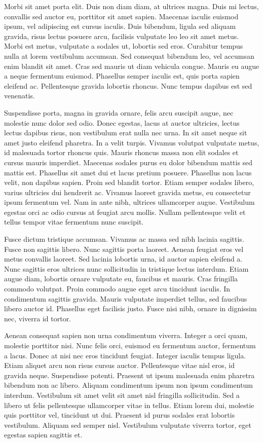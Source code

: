 Morbi sit amet porta elit. Duis non diam diam, at ultrices magna. Duis mi lectus, convallis sed auctor eu, porttitor sit amet sapien. Maecenas iaculis euismod ipsum, vel adipiscing est cursus iaculis. Duis bibendum, ligula sed aliquam gravida, risus lectus posuere arcu, facilisis vulputate leo leo sit amet metus. Morbi est metus, vulputate a sodales ut, lobortis sed eros. Curabitur tempus nulla at lorem vestibulum accumsan. Sed consequat bibendum leo, vel accumsan enim blandit sit amet. Cras sed mauris ut diam vehicula congue. Mauris eu augue a neque fermentum euismod. Phasellus semper iaculis est, quis porta sapien eleifend ac. Pellentesque gravida lobortis rhoncus. Nunc tempus dapibus est sed venenatis.

Suspendisse porta, magna in gravida ornare, felis arcu suscipit augue, nec molestie nunc dolor sed odio. Donec egestas, lacus at auctor ultricies, lectus lectus dapibus risus, non vestibulum erat nulla nec urna. In sit amet neque sit amet justo eleifend pharetra. In a velit turpis. Vivamus volutpat vulputate metus, id malesuada tortor rhoncus quis. Mauris rhoncus massa non elit sodales et cursus mauris imperdiet. Maecenas sodales purus eu dolor bibendum mattis sed mattis est. Phasellus sit amet dui et lacus pretium posuere. Phasellus non lacus velit, non dapibus sapien. Proin sed blandit tortor. Etiam semper sodales libero, varius ultricies dui hendrerit ac. Vivamus laoreet gravida metus, eu consectetur ipsum fermentum vel. Nam in ante nibh, ultrices ullamcorper augue. Vestibulum egestas orci ac odio cursus at feugiat arcu mollis. Nullam pellentesque velit et tellus tempor vitae fermentum nunc suscipit.

Fusce dictum tristique accumsan. Vivamus ac massa sed nibh lacinia sagittis. Fusce non sagittis libero. Nunc sagittis porta laoreet. Aenean feugiat eros vel metus convallis laoreet. Sed lacinia lobortis urna, id auctor sapien eleifend a. Nunc sagittis eros ultrices nunc sollicitudin in tristique lectus interdum. Etiam augue diam, lobortis ornare vulputate eu, faucibus et mauris. Cras fringilla commodo volutpat. Proin commodo augue eget arcu tincidunt iaculis. In condimentum sagittis gravida. Mauris vulputate imperdiet tellus, sed faucibus libero auctor id. Phasellus eget facilisis justo. Fusce nisi nibh, ornare in dignissim nec, viverra id tortor.

Aenean consequat sapien non urna condimentum viverra. Integer a orci quam, molestie porttitor nisi. Nunc felis orci, euismod eu fermentum auctor, fermentum a lacus. Donec at nisi nec eros tincidunt feugiat. Integer iaculis tempus ligula. Etiam aliquet arcu non risus cursus auctor. Pellentesque vitae nisl eros, id gravida neque. Suspendisse potenti. Praesent ut ipsum malesuada enim pharetra bibendum non ac libero. Aliquam condimentum ipsum non ipsum condimentum interdum. Vestibulum sit amet velit sit amet nisl fringilla sollicitudin. Sed a libero ut felis pellentesque ullamcorper vitae in tellus. Etiam lorem dui, molestie quis porttitor vel, tincidunt ut dui. Praesent id purus sodales erat lobortis vestibulum. Aliquam sed semper nisl. Vestibulum vulputate viverra tortor, eget egestas sapien sagittis et. 


